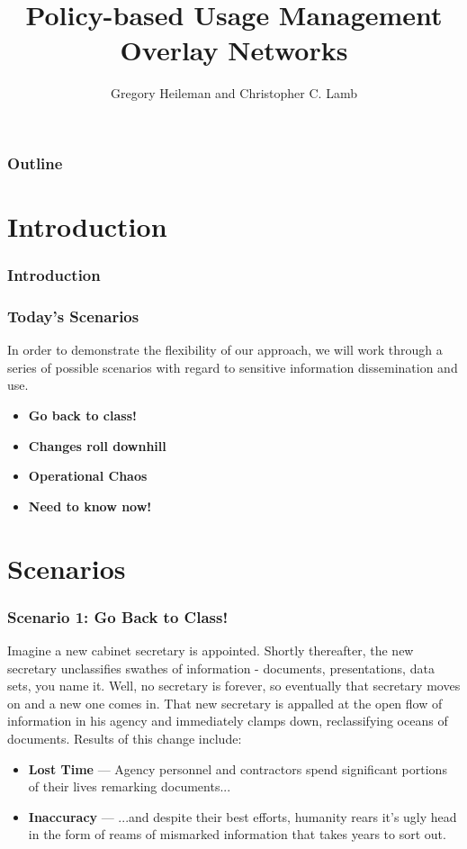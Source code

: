 \documentclass[t,handout, 10pt]{beamer}
\title{Policy-based Usage Management Overlay Networks}
\author [Greg, Chris]{Gregory Heileman and Christopher C. Lamb}
\institute[University of New Mexico]{
\inst {}Department of Electrical and Computer Engineering\\
University of New Mexico}
\date{}
\begin{document}
\begin{frame}
\titlepage
\end{frame}


\begin{frame}
\frametitle{Outline}
\tableofcontents 
\end{frame}

\section{Introduction }

\begin{frame}
\frametitle{Introduction}
\end{frame}

\begin{frame}
\frametitle{Today's Scenarios}
In order to demonstrate the flexibility of our approach, we will work through a series of possible scenarios with regard to sensitive information dissemination and use.
\newline
\pause
\begin{itemize}
\item \textbf{Go back to class!}
\pause
\item \textbf{Changes roll downhill}
\pause
\item \textbf{Operational Chaos}
\pause
\item \textbf{Need to know now!}
\end{itemize}
\end{frame}

\section{Scenarios}

\begin{frame}
\frametitle{Scenario 1: Go Back to Class!}
Imagine a new cabinet secretary is appointed.  Shortly thereafter, the new secretary  unclassifies swathes of information - documents, presentations, data sets, you name it.  Well, no secretary is forever, so eventually that secretary moves on and a new one comes in.  That new secretary is appalled at the open flow of information in his agency and immediately clamps down, reclassifying oceans of documents.
\newline
\newline
Results of this change include:
\newline
\pause
\begin{itemize}
\item \textbf{Lost Time} --- Agency personnel and contractors spend significant portions of their lives remarking documents...
\pause
\item \textbf{Inaccuracy} --- ...and despite their best efforts, humanity rears it's ugly head in the form of reams of mismarked information that takes years to sort out.
\end{itemize}
\end{frame}
\end{document}
